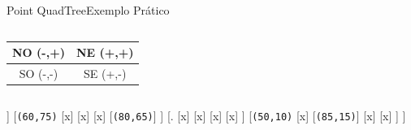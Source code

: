 \documentclass[red, tikz, aspectratio=169, xcolor=dvipsnames]{beamer}
\begin{document}
			\begin{frame}[fragile]{Point QuadTree}{Exemplo Prático}
				\centering
				\vspace{-40px}
				\begin{columns}
					\begin{column}{0.48\textwidth}
						\centering
						\begin{tabular}{|c|c|}
							\hline 
							NO (-,+) & NE (+,+) \\ 
							\hline 
							SO (-,-) & SE (+,-) \\ 
							\hline 
						\end{tabular} 
					\end{column}
					\begin{column}{0.5\textwidth}
						\centering
						\fbox{
							\begin{forest}
								[\texttt{(x,y)}
								[NO]
								[NE]
								[SO]
								[SE]
								]
						\end{forest}}
					\end{column}
				\end{columns}
				\vspace{10px}
				
				\vspace{10px}
				
				\begin{minipage}{\textwidth}
					\centering
					
					\begin{forest}
						[\texttt{(35,40)}
						[\texttt{(05,45)}
						[x]
						[x]
						[x]
						[x]
						]
						[\texttt{(60,75)}
						[x]
						[x]
						[x]
						[\texttt{(80,65)}]
						]
						[.
						[x]
						[x]
						[x]
						[x]
						]
						[\texttt{(50,10)}
						[x]
						[\texttt{(85,15)}]
						[x]
						[x]
						]
						]
					\end{forest}
				\end{minipage}
			\end{frame}
			
\end{document}
